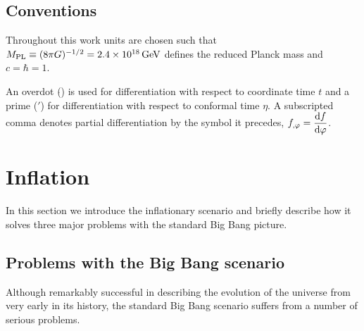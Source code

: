 \subsection{Conventions}
\label{sec:conventions}
Throughout this work units are chosen such that $M_{\mathrm{PL}} \equiv (8\pi G )^{-1/2}=
2 
.4 \times 10^{18}\, {\rm GeV}$ 
defines the reduced Planck mass and $c=\hbar =1$. 

An overdot ($\dot{}$) is used for differentiation with respect to coordinate
time $t$ and a prime ($'$) for differentiation with respect to conformal time
$\eta$. A subscripted comma denotes partial differentiation by the symbol it
precedes, \eg $f_{,\varphi} = \dfrac{\mathrm{d} f}{\mathrm{d} \varphi}$.




\section{Inflation}
\label{sec:inflation-intro}
In this section we introduce the inflationary scenario and briefly describe how
it solves three major problems with the standard Big Bang picture. 

\subsection{Problems with the Big Bang scenario}
\label{sec:problems-intro}
Although remarkably successful in describing the evolution of the universe from
very early in its history, the standard Big Bang scenario suffers from a number
of serious problems. 

